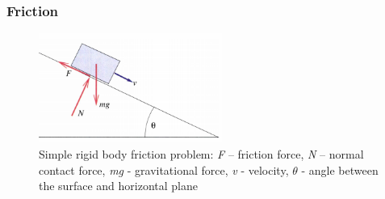 %
%
%

\subsubsection{Friction}

\begin{figure}
  \centering
    \includegraphics[width=60mm]{sections/methodology/images/basic/friction.png}
\caption[Simple rigid body friction problem.]{\label{frictionFig} Simple rigid body friction problem: \emph{F} – friction force, \emph{N} – normal contact force, \emph{mg} - gravitational force, \emph{v} - velocity, $\theta$ - angle between the surface and horizontal plane \citep{RIGIDBODY}}
\end{figure}



